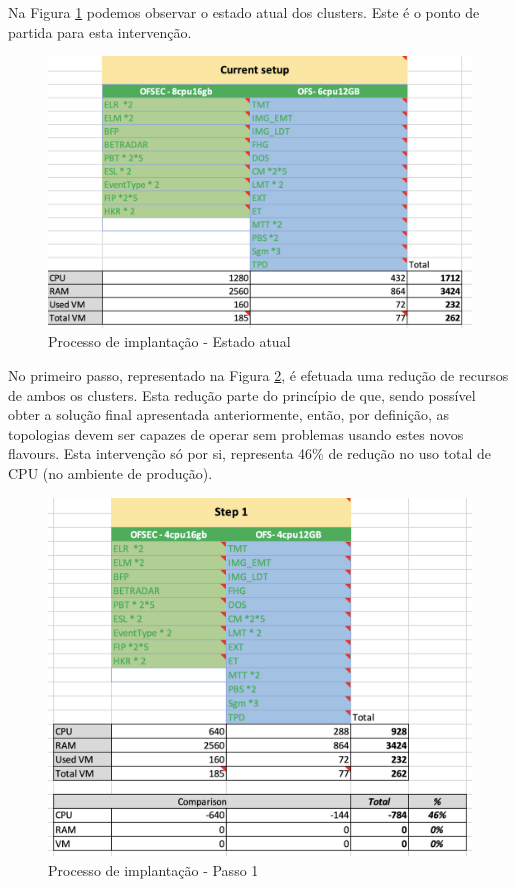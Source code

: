 Na Figura \ref{strat-current} podemos observar o estado atual dos \glspl{cluster}. Este é o ponto
de partida para esta intervenção. 

\begin{figure}[H]
  \centerline{\includegraphics[scale=0.5]{media/content/analise/strat-current.png}}
  \caption{Processo de implantação - Estado atual}
  \label{strat-current}
\end{figure}

No primeiro passo, representado na Figura \ref{strat-1}, é efetuada uma redução de recursos 
de ambos os \glspl{cluster}. Esta redução parte do princípio de que, sendo possível obter a 
solução final apresentada anteriormente, então, por definição, as topologias devem ser capazes de
operar sem problemas usando estes novos \glspl{flavour}. Esta intervenção só por si, representa
46\% de redução no uso total de CPU (no ambiente de produção).

\begin{figure}[H]
  \centerline{\includegraphics[scale=0.5]{media/content/analise/strat-1.png}}
  \caption{Processo de implantação - Passo 1}
  \label{strat-1}
\end{figure}

